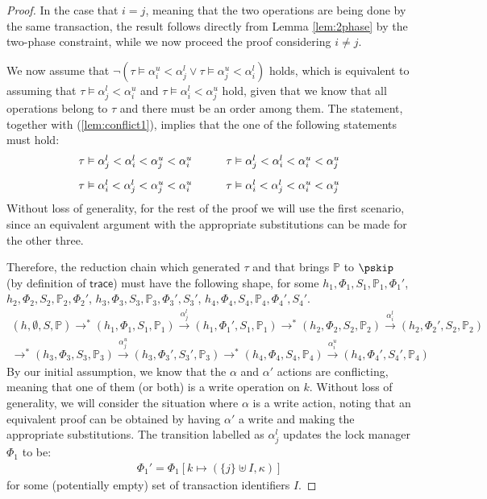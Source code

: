 \begin{proof}
In the case that $i = j$, meaning that the two operations are being done by the same transaction, the result follows directly from Lemma \ref{lem:2phase} by the two-phase constraint, while we now proceed the proof considering $i \neq j$.

We now assume that $\lnot \left( \tau \vDash \alpha_i^u < \alpha_j^l  \lor \tau \vDash \alpha_j^u < \alpha_i^l \right)$ holds, which is equivalent to assuming that $\tau \vDash \alpha_j^l < \alpha_i^u$ and $\tau \vDash \alpha_i^l < \alpha_j^u$ hold, given that we know that all operations belong to $\tau$ and there must be an order among them. The statement, together with (\ref{lem:conflict1}), implies that the one of the following statements must hold:
\[
\begin{array}{c @{\hspace{30pt}} c}
	\tau \vDash \alpha_j^l < \alpha_i^l < \alpha_j^u < \alpha_i^u
	&
	\tau \vDash \alpha_j^l < \alpha_i^l < \alpha_i^u < \alpha_j^u
	\\[1em]
	\tau \vDash \alpha_i^l < \alpha_j^l < \alpha_j^u < \alpha_i^u
	&
	\tau \vDash \alpha_i^l < \alpha_j^l < \alpha_i^u < \alpha_j^u
\end{array}
\]
Without loss of generality, for the rest of the proof we will use the first scenario, since an equivalent argument with the appropriate substitutions can be made for the other three.

Therefore, the reduction chain which generated $\tau$ and that brings $\mathds{P}$ to $\pskip$ (by definition of $\mathsf{trace}$) must have the following shape, for some $h_1, \Phi_1, S_1, \mathds{P}_1, \Phi_1'$, $h_2, \Phi_2, S_2, \mathds{P}_2, \Phi_2'$, $h_3, \Phi_3, S_3, \mathds{P}_3, \Phi_3', S_3'$, $h_4, \Phi_4, S_4, \mathds{P}_4, \Phi_4', S_4'$.
\begin{gather*}
(h, \emptyset, S, \mathds{P}) \rightarrow^* (h_1, \Phi_1, S_1, \mathds{P}_1) \xrightarrow{\alpha_j^l} (h_1, \Phi_1', S_1, \mathds{P}_1) \rightarrow^* (h_2, \Phi_2, S_2, \mathds{P}_2) \xrightarrow{\alpha_i^l} (h_2, \Phi_2', S_2, \mathds{P}_2)
\\
\rightarrow^* (h_3, \Phi_3, S_3, \mathds{P}_3) \xrightarrow{\alpha_j^u} (h_3, \Phi_3', S_3', \mathds{P}_3) \rightarrow^* (h_4, \Phi_4, S_4, \mathds{P}_4) \xrightarrow{\alpha_i^u} (h_4, \Phi_4', S_4', \mathds{P}_4)
\end{gather*}
By our initial assumption, we know that the $\alpha$ and $\alpha'$ actions are conflicting, meaning that one of them (or both) is a write operation on $k$. Without loss of generality, we will consider the situation where $\alpha$ is a write action, noting that an equivalent proof can be obtained by having $\alpha'$ a write and making the appropriate substitutions. The transition labelled as $\alpha_j^l$ updates the lock manager $\Phi_1$ to be:
\begin{gather}
	\label{lem:conflict2}
	\Phi_1' = \Phi_1[k \mapsto (\{j\} \uplus I, \kappa)]
\end{gather}
for some (potentially empty) set of transaction identifiers $I$.


\end{proof}
